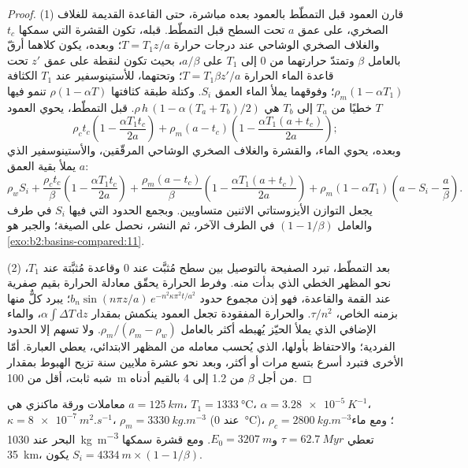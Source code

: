 \begin{proof}
(1) قارن العمود قبل التمطّط بالعمود بعده مباشرة، حتى القاعدة القديمة
للغلاف الصخري، على عمق $a$ تحت السطح قبل التمطّط. قبله، تكون القشرة التي
سمكها $t_c$ والغلاف الصخري الوشاحي عند درجات حرارة $T = T_1 z/a$؛ وبعده، يكون كلاهما
أرقّ بالعامل $\beta$ وتمتدّ حرارتهما من $0$ إلى $T_1$ على $a/\beta$، بحيث تكون لنقطة
على عمق $z'$ تحت قاعدة الماء الحرارة $T = T_1\beta z'/a$؛ وتحتهما، للأستينوسفير عند
$T_1$ الكثافة $\rho_m(1 - \alpha T_1)$؛ وفوقهما يملأ الماء العمق $S_i$. وكتلة
طبقة كثافتها $\rho(1 - \alpha T)$ تنمو فيها $T$ خطيًا من $T_a$ إلى $T_b$ هي
$\rho\,h\,(1 - \alpha(T_a + T_b)/2)$. قبل التمطّط، يحوي العمود
\[
  \rho_c t_c\left(1 - \frac{\alpha T_1 t_c}{2a}\right)
  + \rho_m (a - t_c)\left(1 - \frac{\alpha T_1 (a + t_c)}{2a}\right);
\]
وبعده، يحوي الماء، والقشرة والغلاف الصخري الوشاحي المرقّقين، والأستينوسفير الذي
يملأ بقية العمق $a$:
\[
  \rho_w S_i + \frac{\rho_c t_c}{\beta}\left(1 - \frac{\alpha T_1 t_c}{2a}\right)
  + \frac{\rho_m (a - t_c)}{\beta}\left(1 - \frac{\alpha T_1 (a + t_c)}{2a}\right)
  + \rho_m(1 - \alpha T_1)\left(a - S_i - \frac{a}{\beta}\right).
\]
يجعل التوازن الأيزوستاتي الاثنين متساويين. وبجمع الحدود التي فيها $S_i$ في طرف والعامل
$(1 - 1/\beta)$ في الطرف الآخر، ثم النشر، نحصل على الصيغة؛ والجبر هو
\cref{exo:b2:basins-compared:11}.

(2) بعد التمطّط، تبرد الصفيحة بالتوصيل بين سطح مُثبَّت عند $0$ وقاعدة مُثبَّتة
عند $T_1$، نحو المظهر الخطي الذي بدأت منه. وفرط الحرارة يحقّق معادلة
الحرارة بقيم صفرية عند القمة والقاعدة، فهو إذن مجموع حدود
$b_n\sin(n\pi z/a)\,e^{-n^2\kappa\pi^2 t/a^2}$؛ يبرد كلٌّ منها بزمنه الخاص، $\tau/n^2$.
والحرارة المفقودة تجعل العمود ينكمش بمقدار $\alpha\int \Delta T\,\mathrm{d}z$، والماء الإضافي
الذي يملأ الحيّز يُهبطه أكثر بالعامل $\rho_m/(\rho_m - \rho_w)$. ولا تسهم إلا الحدود
الفردية؛ والاحتفاظ بأولها، الذي يُحسب معامله من المظهر الابتدائي، يعطي
العبارة. أمّا الأخرى فتبرد أسرع بتسع مرات أو أكثر، وبعد نحو عشرة ملايين سنة
تزيح الهبوط بمقدار شبه ثابت، أقل من \qty{100}{m} من أجل $\beta$ من
1.2 إلى 4 بالقيم أدناه.
\end{proof}

معاملات ورقة ماكنزي هي $a = \qty{125}{km}$، $T_1 = \qty{1333}{\celsius}$،
$\alpha = \qty{3.28e-5}{K^{-1}}$، $\kappa = \qty{8e-7}{m^2.s^{-1}}$، $\rho_m =
\qty{3330}{kg.m^{-3}}$ (عند \qty{0}{\celsius})، $\rho_c = \qty{2800}{kg.m^{-3}}$؛ ومع ماء البحر عند
\qty{1030}{kg.m^{-3}} تعطي $\tau = \qty{62.7}{Myr}$ و$E_0 = \qty{3207}{m}$. ومع قشرة سمكها
\qty{35}{km}، يكون  $S_i = \qty{4334}{m} \times (1 - 1/\beta)$.


